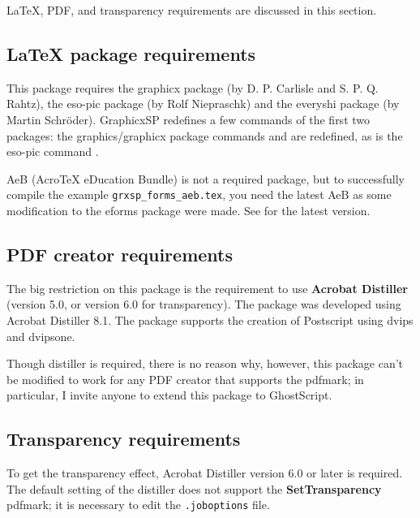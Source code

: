 \documentclass{article}
\let\pkg\textsf
\let\app\textsf
\begin{document}
{\LaTeX}, PDF, and transparency requirements are discussed in this section.

\subsection{{\LaTeX} package requirements}

This package requires the \pkg{graphicx} package (by D. P. Carlisle and S. P. Q.
Rahtz), the \pkg{eso-pic} package (by Rolf Niepraschk) and the \pkg{everyshi}
package (by Martin Schr\"oder). \pkg{GraphicxSP} redefines a few commands of the
first two packages: the \pkg{graphics}/\pkg{graphicx} package commands 
and  are redefined, as is the \pkg{eso-pic} command .

\pkg{AeB} (Acro\negthinspace\TeX{} eDucation Bundle) is not a required
package, but to successfully compile the example
\texttt{grxsp\_forms\_aeb.tex}, you need the latest \pkg{AeB} as some
modification to the eforms package were made. See
 for the latest
version.

\subsection{PDF creator requirements}

The big restriction on this package is the requirement to use
\textbf{Acrobat Distiller} (version 5.0, or version 6.0 for transparency).
The package was developed using Acrobat Distiller 8.1. The package supports the
creation of Postscript using \app{dvips} and \app{dvipsone}.

Though distiller is required, there is no reason why, however, this
package can't be modified to work for any PDF creator that supports
the pdfmark; in particular, I invite anyone to extend this package
to \app{GhostScript}.

\subsection{Transparency requirements}

To get the transparency effect, \app{Acrobat Distiller} version 6.0 or
later is required. The default setting of the distiller does not
support the \textbf{SetTransparency} pdfmark; it is necessary to
edit the \texttt{.joboptions} file.
\end{document}

